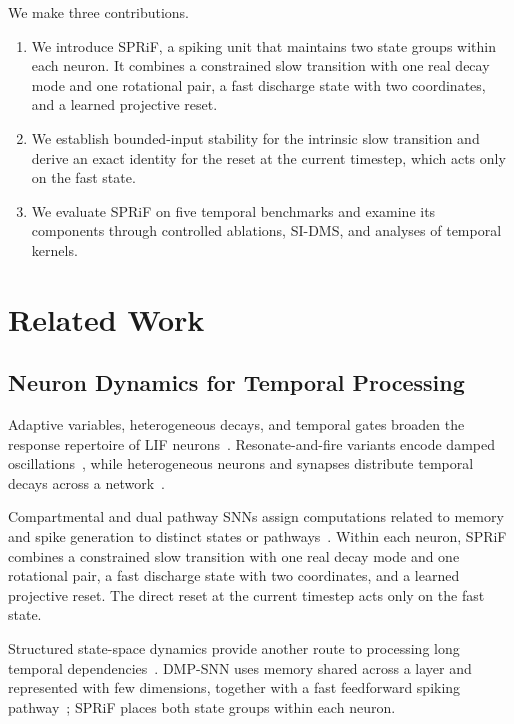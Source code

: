 \documentclass[letterpaper]{article} %
\begin{document}
We make three contributions.
\begin{enumerate}
\item We introduce SPRiF, a spiking unit that maintains two state groups within each neuron. It combines a constrained slow transition with one real decay mode and one rotational pair, a fast discharge state with two coordinates, and a learned projective reset.
\item We establish bounded-input stability for the intrinsic slow transition and derive an exact identity for the reset at the current timestep, which acts only on the fast state.
\item We evaluate SPRiF on five temporal benchmarks and examine its components through controlled ablations, SI-DMS, and analyses of temporal kernels.
\end{enumerate}


\section{Related Work}

\subsection{Neuron Dynamics for Temporal Processing}

Adaptive variables, heterogeneous decays, and temporal gates broaden the response repertoire of LIF neurons~\cite{asrnn,adlif,hetsyn,ltgate}. Resonate-and-fire variants encode damped oscillations~\cite{izhikevich_rf,brf,prf,drf}, while heterogeneous neurons and synapses distribute temporal decays across a network~\cite{heterogeneity,hetsyn}.

Compartmental and dual pathway SNNs assign computations related to memory and spike generation to distinct states or pathways~\cite{tclif,dhsnn,dendrify,lstmlif,sun2026dmp,zhang2025reset}. Within each neuron, SPRiF combines a constrained slow transition with one real decay mode and one rotational pair, a fast discharge state with two coordinates, and a learned projective reset. The direct reset at the current timestep acts only on the fast state.

Structured state-space dynamics provide another route to processing long temporal dependencies~\cite{silif,spikingssms}. DMP-SNN uses memory shared across a layer and represented with few dimensions, together with a fast feedforward spiking pathway~\cite{sun2026dmp}; SPRiF places both state groups within each neuron.
\end{document}

